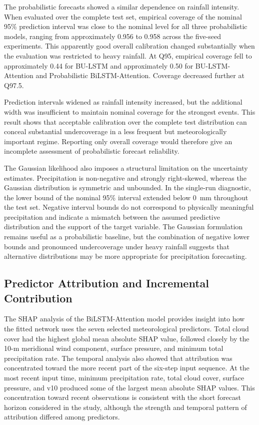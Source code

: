 \documentclass[referee,pdflatex,sn-basic]{sn-jnl}%
\theoremstyle{thmstyleone}%
\theoremstyle{thmstyletwo}%
\theoremstyle{thmstylethree}%
\begin{document}
The probabilistic forecasts showed a similar dependence on rainfall intensity. When evaluated over the complete test set, empirical coverage of the nominal 95\% prediction interval was close to the nominal level for all three probabilistic models, ranging from approximately 0.956 to 0.958 across the five-seed experiments. This apparently good overall calibration changed substantially when the evaluation was restricted to heavy rainfall. At Q95, empirical coverage fell to approximately 0.44 for BU-LSTM and approximately 0.50 for BU-LSTM-Attention and Probabilistic BiLSTM-Attention. Coverage decreased further at Q97.5.

Prediction intervals widened as rainfall intensity increased, but the additional width was insufficient to maintain nominal coverage for the strongest events. This result shows that acceptable calibration over the complete test distribution can conceal substantial undercoverage in a less frequent but meteorologically important regime. Reporting only overall coverage would therefore give an incomplete assessment of probabilistic forecast reliability.

The Gaussian likelihood also imposes a structural limitation on the uncertainty estimates. Precipitation is non-negative and strongly right-skewed, whereas the Gaussian distribution is symmetric and unbounded. In the single-run diagnostic, the lower bound of the nominal 95\% interval extended below 0~mm throughout the test set. Negative interval bounds do not correspond to physically meaningful precipitation and indicate a mismatch between the assumed predictive distribution and the support of the target variable. The Gaussian formulation remains useful as a probabilistic baseline, but the combination of negative lower bounds and pronounced undercoverage under heavy rainfall suggests that alternative distributions may be more appropriate for precipitation forecasting.

\subsection{Predictor Attribution and Incremental Contribution}

The SHAP analysis of the BiLSTM-Attention model provides insight into how the fitted network uses the seven selected meteorological predictors. Total cloud cover had the highest global mean absolute SHAP value, followed closely by the 10-m meridional wind component, surface pressure, and minimum total precipitation rate. The temporal analysis also showed that attribution was concentrated toward the more recent part of the six-step input sequence. At the most recent input time, minimum precipitation rate, total cloud cover, surface pressure, and v10 produced some of the largest mean absolute SHAP values. This concentration toward recent observations is consistent with the short forecast horizon considered in the study, although the strength and temporal pattern of attribution differed among predictors.
\end{document}
